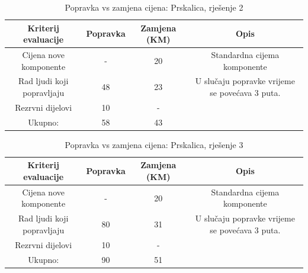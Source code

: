 \documentclass[12pt]{article}
\begin{document}
\begin{landscape}
\vspace*{\fill}
\begin{table}[htbp]
  \centering
   \footnotesize
  \caption{Popravka vs zamjena cijena: Prskalica, rješenje 2}
    \begin{tabular}{cccc}
    \toprule
    Kriterij evaluacije & Popravka & Zamjena (KM) & Opis \\
    \midrule
     Cijena nove komponente & -     & 20    & \multicolumn{1}{p{23.215em}}{Standardna \newline{}cijema\newline{} komponente} \\
    \midrule
    Rad ljudi koji popravljaju & 48    & 23    & \multicolumn{1}{p{23.215em}}{ U slučaju popravke vrijeme se povećava 3 puta. } \\
    \midrule
    Rezrvni dijelovi & 10    & -     &  \\
    \midrule
    Ukupno: & 58    & 43    &  \\
    \bottomrule
    \end{tabular}%
  \label{tab:popravka9}%
\end{table}%

\begin{table}[htbp]
  \centering
   \footnotesize
  \caption{Popravka vs zamjena cijena: Prskalica, rješenje 3}
    \begin{tabular}{cccc}
    \toprule
    Kriterij evaluacije & Popravka & Zamjena (KM) & Opis \\
    \midrule
     Cijena nove komponente & -     & 20    & \multicolumn{1}{p{24.285em}}{Standardna \newline{}cijema\newline{} komponente} \\
    \midrule
    Rad ljudi koji popravljaju & 80    & 31    & \multicolumn{1}{p{24.285em}}{ U slučaju popravke vrijeme se povećava 3 puta. } \\
    \midrule
    Rezrvni dijelovi & 10    & -     &  \\
    \midrule
    Ukupno: & 90    & 51    &  \\
    \bottomrule
    \end{tabular}%
  \label{tab:popravka10}%
\end{table}%
\vspace*{\fill}
\end{landscape}
\end{document}

